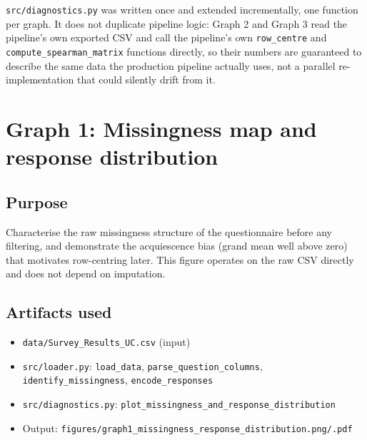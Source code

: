 \documentclass[11pt]{article}
\begin{document}
\texttt{src/diagnostics.py} was written once and extended incrementally, one
function per graph. It does not duplicate pipeline logic: Graph 2 and Graph 3
read the pipeline's own exported CSV and call the pipeline's own
\texttt{row\_centre} and \texttt{compute\_spearman\_matrix} functions directly,
so their numbers are guaranteed to describe the same data the production
pipeline actually uses, not a parallel re-implementation that could silently
drift from it.

\section{Graph 1: Missingness map and response distribution}

\subsection{Purpose}
Characterise the raw missingness structure of the questionnaire before any
filtering, and demonstrate the acquiescence bias (grand mean well above zero)
that motivates row-centring later. This figure operates on the raw CSV
directly and does not depend on imputation.

\subsection{Artifacts used}
\begin{itemize}
  \item \texttt{data/Survey\_Results\_UC.csv} (input)
  \item \texttt{src/loader.py}: \texttt{load\_data}, \texttt{parse\_question\_columns},
        \texttt{identify\_missingness}, \texttt{encode\_responses}
  \item \texttt{src/diagnostics.py}: \texttt{plot\_missingness\_and\_response\_distribution}
  \item Output: \texttt{figures/graph1\_missingness\_response\_distribution.png/.pdf}
\end{itemize}
\end{document}

